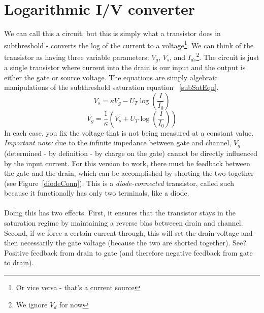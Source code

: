 \documentclass[report]{subfiles}
\begin{document}

\section{Logarithmic I/V converter}
We can call this a circuit, but this is simply what a transistor does in subthreshold - converts the log of the current to a voltage\footnote{Or vice versa - that's a current source}. We can think of the transistor as having three variable parameters: $V_g$, $V_s$, and $I_{ds}$\footnote{We ignore $V_d$ for now}. The circuit is just a single transistor where current into the drain is our input and the output is either the gate or source voltage. The equations are simply algebraic manipulations of the subthreshold saturation equation ~\eqref{subSatEqn}.
\begin{equation}
V_s = \kappa V_g - U_T \log \left(\frac{I}{I_0}\right)
\end{equation}
\begin{equation}
V_g = \frac{1}{\kappa}\left( V_s + U_T \log \left(\frac{I}{I_0}\right) \right)
\end{equation}
In each case, you fix the voltage that is not being measured at a constant value. \emph{Important note:} due to the infinite impedance between gate and channel, $V_g$ (determined  - by definition - by charge on the gate) cannot be directly influenced by the input current. For this version to work, there must be feedback between the gate and the drain, which can be accomplished by shorting the two together (see Figure~\ref{diodeConn}). This is a \emph{diode-connected} transistor, called such because it functionally has only two terminals, like a diode.\\ \\
Doing this has two effects. First, it ensures that the transistor stays in the saturation regime by maintaining a reverse bias betweeen drain and channel. Second, if we force a certain current through, this will set the drain voltage and then necessarily the gate voltage (because the two are shorted together). See? Positive feedback from drain to gate (and therefore negative feedback from gate to drain).
\end{document}
